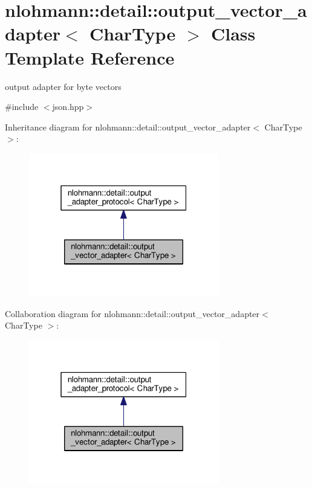 \hypertarget{classnlohmann_1_1detail_1_1output__vector__adapter}{}\section{nlohmann\+:\+:detail\+:\+:output\+\_\+vector\+\_\+adapter$<$ Char\+Type $>$ Class Template Reference}
\label{classnlohmann_1_1detail_1_1output__vector__adapter}


output adapter for byte vectors  




{\ttfamily \#include $<$json.\+hpp$>$}



Inheritance diagram for nlohmann\+:\+:detail\+:\+:output\+\_\+vector\+\_\+adapter$<$ Char\+Type $>$\+:
\nopagebreak
\begin{figure}[H]
\begin{center}
\leavevmode
\includegraphics[width=235pt]{classnlohmann_1_1detail_1_1output__vector__adapter__inherit__graph}
\end{center}
\end{figure}


Collaboration diagram for nlohmann\+:\+:detail\+:\+:output\+\_\+vector\+\_\+adapter$<$ Char\+Type $>$\+:
\nopagebreak
\begin{figure}[H]
\begin{center}
\leavevmode
\includegraphics[width=235pt]{classnlohmann_1_1detail_1_1output__vector__adapter__coll__graph}
\end{center}
\end{figure}
